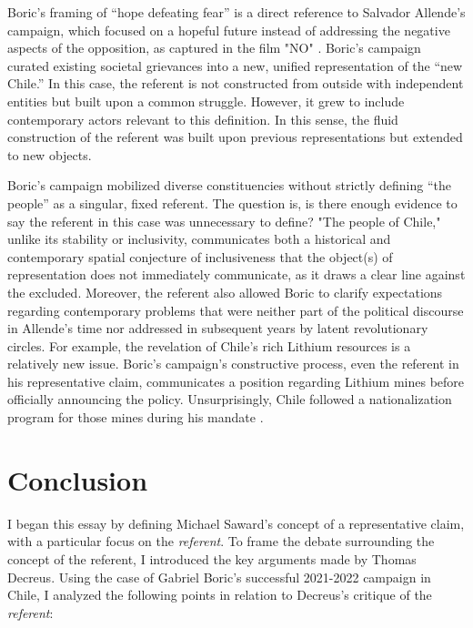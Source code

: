 Boric’s framing of “hope defeating fear” \parencite{hodgson2021} is a direct reference to Salvador Allende's campaign, which focused on a hopeful future instead of addressing the negative aspects of the opposition, as captured in the film "NO" \parencite[]{zotero-41264}. Boric's campaign curated existing societal grievances into a new, unified representation of the “new Chile.” In this case, the referent is not constructed from outside with independent entities but built upon a common struggle. However, it grew to include contemporary actors relevant to this definition. In this sense, the fluid construction of the referent was built upon previous representations but extended to new objects.

Boric’s campaign mobilized diverse constituencies without strictly defining “the people” as a singular, fixed referent. The question is, is there enough evidence to say the referent in this case was unnecessary to define? "The people of Chile," unlike its stability or inclusivity, communicates both a historical and contemporary spatial conjecture of inclusiveness that the object(s) of representation does not immediately communicate, as it draws a clear line against the excluded. Moreover, the referent also allowed Boric to clarify expectations regarding contemporary problems that were neither part of the political discourse in Allende's time nor addressed in subsequent years by latent revolutionary circles. For example, the revelation of Chile's rich Lithium resources is a relatively new issue. Boric's campaign's constructive process, even the referent in his representative claim, communicates a position regarding Lithium mines before officially announcing the policy. Unsurprisingly, Chile followed a nationalization program for those mines during his mandate \parencite{villegas2023}.

\chapter{Conclusion}

I began this essay by defining Michael Saward's concept of a representative claim, with a particular focus on the \textit{referent}. To frame the debate surrounding the concept of the referent, I introduced the key arguments made by Thomas Decreus. Using the case of Gabriel Boric's successful 2021-2022 campaign in Chile, I analyzed the following points in relation to Decreus's critique of the \textit{referent}:

